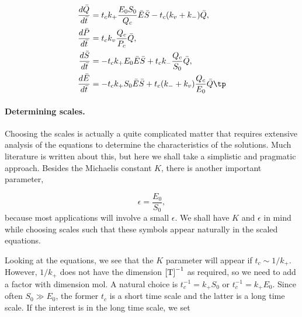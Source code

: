 \documentclass[graybox,envcountchap,sectrefs,final]{svmonodo}
\begin{document}
\begin{align*}
\frac{d\bar Q}{d\bar t} &= t_ck_+\frac{E_0S_0}{Q_c}\bar E\bar S
- t_c(k_v + k_-)\bar Q,\\ 
\frac{d\bar P}{d\bar t} &= t_ck_v\frac{Q_c}{P_c}\bar Q,\\ 
\frac{d\bar S}{d\bar t} &= -t_ck_+E_0\bar E\bar S
+ t_ck_-\frac{Q_c}{S_0}\bar Q,\\ 
\frac{d\bar E}{d\bar t} &= -t_ck_+S_0\bar E\bar S
+ t_c(k_- + k_v)\frac{Q_c}{E_0}\bar Q\tp
\end{align*}

\paragraph{Determining scales.}
Choosing the scales is actually a quite complicated matter that requires
extensive analysis of the equations to determine the characteristics of
the solutions. Much literature is written about this, but here we shall
take a simplistic and pragmatic approach.
Besides the Michaelis constant $K$, there is another important parameter,

\[ \epsilon = \frac{E_0}{S_0},\]
because most applications will involve a small $\epsilon$.
We shall have $K$ and $\epsilon$ in mind while choosing scales such that
these symbols appear naturally in the scaled equations.

Looking at the equations, we see that the $K$ parameter will appear
if $t_c\sim 1/k_+$. However, $1/k_+$ does not have the dimension
$\hbox{[T]}^{-1}$ as required, so we need to add a factor with dimension
mol. A natural choice is
$t_c^{-1}=k_+S_0$ or $t_c^{-1}=k_+E_0$. Since often $S_0\gg E_0$,
the former $t_c$ is a short time scale and the latter is a long
time scale. If the interest is in the long time scale, we set
\end{document}
